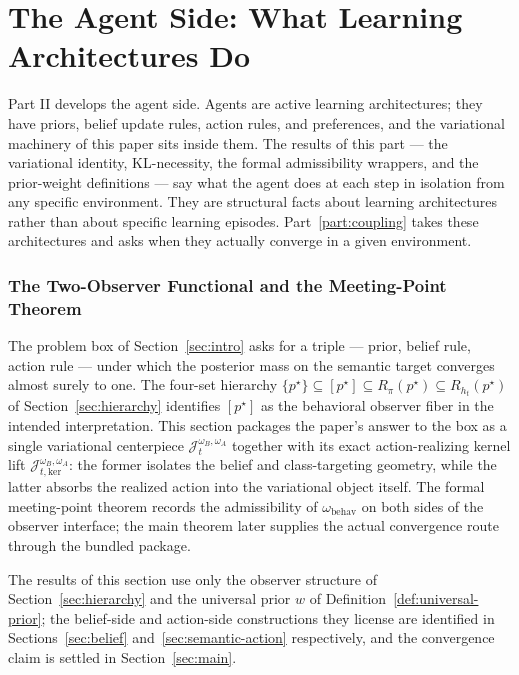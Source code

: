 \documentclass[11pt]{article}
\theoremstyle{definition}
\theoremstyle{remark}
\theoremstyle{plain}
\theoremstyle{definition}
\begin{document}
\part{The Agent Side: What Learning Architectures Do}
\label{part:agent}

Part II develops the agent side. Agents are active learning architectures; they have priors, belief update rules, action rules, and preferences, and the variational machinery of this paper sits inside them. The results of this part --- the variational identity, KL-necessity, the formal admissibility wrappers, and the prior-weight definitions --- say what the agent does at each step in isolation from any specific environment. They are structural facts about learning architectures rather than about specific learning episodes. Part~\ref{part:coupling} takes these architectures and asks when they actually converge in a given environment.

\section{The Two-Observer Functional and the Meeting-Point Theorem}
\label{sec:functional}

The problem box of Section~\ref{sec:intro} asks for a triple --- prior, belief rule, action rule --- under which the posterior mass on the semantic target converges almost surely to one. The four-set hierarchy $\{p^\star\}\subseteq[p^\star]\subseteq R_\pi(p^\star)\subseteq R_{h_t}(p^\star)$ of Section~\ref{sec:hierarchy} identifies $[p^\star]$ as the behavioral observer fiber in the intended interpretation. This section packages the paper's answer to the box as a single variational centerpiece $\mathcal J_t^{\omega_B,\omega_A}$ together with its exact action-realizing kernel lift $\mathcal J_{t,\mathrm{ker}}^{\omega_B,\omega_A}$: the former isolates the belief and class-targeting geometry, while the latter absorbs the realized action into the variational object itself. The formal meeting-point theorem records the admissibility of $\omega_{\mathrm{behav}}$ on both sides of the observer interface; the main theorem later supplies the actual convergence route through the bundled package.

The results of this section use only the observer structure of Section~\ref{sec:hierarchy} and the universal prior $w$ of Definition~\ref{def:universal-prior}; the belief-side and action-side constructions they license are identified in Sections~\ref{sec:belief} and~\ref{sec:semantic-action} respectively, and the convergence claim is settled in Section~\ref{sec:main}.
\end{document}

